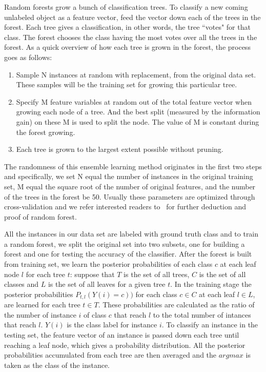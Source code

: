 Random forests grow a bunch of classification trees. To classify a new coming unlabeled object as a feature vector, 
feed the vector down each of the trees in the forest. Each tree gives a classification, in other words, the 
tree ``votes" for that class. The forest chooses the class having the most votes over all the trees in the forest. 
As a quick overview of how each tree is grown in the forest, the process goes as follows:
\begin{enumerate}
\item Sample N instances at random with replacement, from the original data set. These samples will be the training set for growing this particular tree.
\item Specify M feature variables at random out of the total feature vector when growing each node of a tree. And the best split (measured by the information gain) on these M is used to split the node. The value of M is constant during the forest growing.
\item Each tree is grown to the largest extent possible without pruning.
\end{enumerate}
The randomness of this ensemble learning method originates in the first two steps and specifically, we set N equal the number of instances in the original training set, M equal the square root of the
number of original features, and the number of the trees in the forest be 50. Usually these parameters are optimized
through cross-validation and we refer interested readers to~\cite{RF} for further deduction and proof of random forest.

All the instances in our data set are labeled with ground truth class and to train a random forest, we split the original set into two subsets, one for building 
a forest and one for testing the accuracy of the classifier. After the forest is built from training set, we learn the posterior probabilities of each class $c$ 
at each leaf node $l$ for each tree $t$: suppose that $T$ is the set of all trees, $C$ is the set of all classes and $L$ is the set of all leaves for a given 
tree $t$. In the training stage the posterior probabilities $P_{t,l}(Y(i) = c))$ for each class $c\in C$ at each leaf $l\in L$, are learned for each tree $t\in T$. 
These probabilities are calculated as the ratio of the number of instance $i$ of class $c$ that reach $l$ to the total number of intances that reach $l$. $Y(i)$ 
is the class label for instance $i$. To classify an instance in the testing set, the feature vector of an instance is passed down each tree until reaching a leaf 
node, which gives a probability distribution. All the posterior probabilities accumulated from each tree are then averaged and the $argmax$ is taken as the class 
of the instance. 

